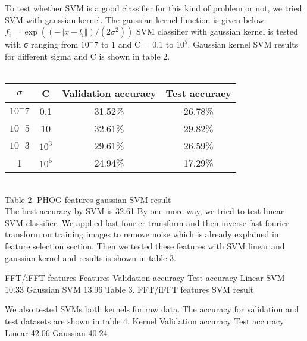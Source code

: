 \documentclass[10pt,twocolumn]{article}
\begin{document}
To test whether SVM is a good classifier for this kind of problem or not, we tried SVM with gaussian kernel. The gaussian kernel function is given below:
$f_i=\exp⁡((-‖x-l_i ‖)/(2σ^2 ))$
\cite {larochelle2007empirical} SVM classifier with gaussian kernel is tested with σ ranging from $10^-7$ to $1$ and C = 0.1 to $10^5$. Gaussian kernel SVM results for different sigma and C is shown in table 2.
\\
\\
\begin{tabular}{|c|c|c|c|}
\hline
$\sigma$ & C &	Validation accuracy	& Test accuracy \\ \hline
$10^-7$  & 0.1	& 31.52\%	& 26.78\% \\
$10^-5$	 & 10	& 32.61\%	& 29.82\% \\
$10^-3$	 & $10^3$ & 29.61\%	& 26.59\% \\
1        &$10^5$ & 	24.94\% & 	17.29\% \\
\hline
\end{tabular}
\\

Table 2. PHOG features gaussian SVM result
\\

The best accuracy by SVM is 32.61%
By one more way, we tried to test linear SVM classifier. We applied fast fourier transform and then inverse fast fourier transform on training images to remove noise which is already explained in feature selection section. Then we tested these features with SVM linear and gaussian kernel and results is shown in table 3.

FFT/iFFT features
Features	Validation accuracy	Test accuracy
Linear SVM	10.33%
Gaussian SVM	13.96%
Table 3. FFT/iFFT features SVM result

We also tested SVMs both kernels for raw data. The accuracy for validation and test datasets are shown in table 4.
Kernel	Validation accuracy	Test accuracy
Linear	42.06%
Gaussian	40.24%
\end{document}
